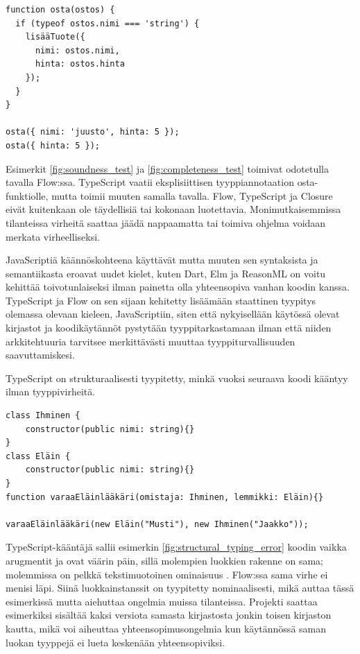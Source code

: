 \begin{minipage}{\linewidth}
\begin{lstlisting}[caption={Toimiva JavaScript-ohjelma: virheelliseltä kutsulta on suojauduttu tarkistuksella.},label={fig:completeness_test}]
function osta(ostos) {
  if (typeof ostos.nimi === 'string') {
    lisääTuote({
      nimi: ostos.nimi,
      hinta: ostos.hinta
    });
  }
}

osta({ nimi: 'juusto', hinta: 5 });
osta({ hinta: 5 });
\end{lstlisting}
\end{minipage}
Esimerkit \ref{fig:soundness_test} ja \ref{fig:completeness_test} toimivat
odotetulla tavalla Flow:ssa. TypeScript vaatii eksplisiittisen tyyppiannotaation
osta-funktiolle, mutta toimii muuten samalla tavalla. Flow, TypeScript ja
Closure eivät kuitenkaan ole täydellisiä tai kokonaan luotettavia.
Monimutkaisemmissa tilanteissa virheitä saattaa jäädä nappaamatta tai toimiva
ohjelma voidaan merkata virheelliseksi.

JavaScriptiä käännöskohteena käyttävät
mutta muuten sen syntaksista ja semantiikasta eroavat uudet kielet,
kuten Dart, Elm ja ReasonML on voitu kehittää toivotunlaiseksi ilman painetta olla
yhteensopiva vanhan koodin kanssa. TypeScript ja Flow on sen sijaan kehitetty
lisäämään staattinen tyypitys olemassa olevaan kieleen, JavaScriptiin,
siten että nykyisellään käytössä olevat kirjastot ja koodikäytännöt pystytään
tyyppitarkastamaan ilman että niiden arkkitehtuuria tarvitsee merkittävästi
muuttaa tyyppiturvallisuuden saavuttamiskesi.

TypeScript on strukturaalisesti tyypitetty, minkä vuoksi seuraava koodi kääntyy
ilman tyyppivirheitä.

\begin{minipage}{\linewidth}
\begin{lstlisting}[caption={
  Loogisen virheen sisältävä, mutta ilman virheitä kääntyvä TypeScript-ohjelma.
}, label={fig:structural_typing_error}]
class Ihminen {
    constructor(public nimi: string){}
}
class Eläin {
    constructor(public nimi: string){}
}
function varaaEläinlääkäri(omistaja: Ihminen, lemmikki: Eläin){}

varaaEläinlääkäri(new Eläin("Musti"), new Ihminen("Jaakko"));
\end{lstlisting}
\end{minipage}
TypeScript-kääntäjä sallii esimerkin \ref{fig:structural_typing_error} koodin
vaikka arugmentit \mbox{} ja \mbox{}
ovat väärin päin, sillä molempien luokkien rakenne on sama; molemmissa on
pelkkä tekstimuotoinen ominaisuus . Flow:ssa sama virhe ei menisi läpi.
Siinä luokkainstanssit on tyypitetty nominaalisesti, mikä auttaa tässä
esimerkissä mutta aiehuttaa ongelmia muissa tilanteissa. Projekti saattaa
esimerkiksi sisältää kaksi versiota samasta kirjastosta jonkin toisen
kirjaston kautta, mikä voi aiheuttaa yhteensopimusongelmia kun käytännössä
saman luokan tyyppejä ei lueta keskenään yhteensopiviksi.